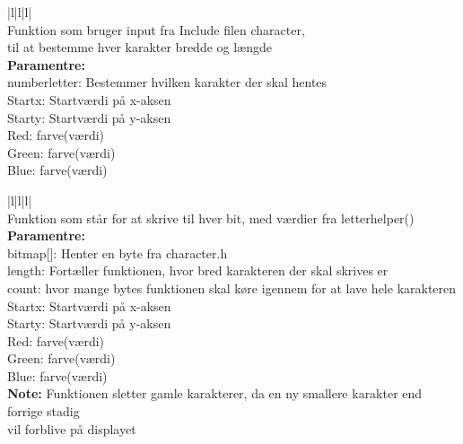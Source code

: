 \begin{center}
\begin{tabular}{ |l|l|l| }
\hline
{} \\
\hline
Funktion som bruger input fra Include filen character,\\ til at bestemme hver karakter bredde og længde\\
\hline
\textbf{Paramentre:}  \\numberletter: Bestemmer hvilken karakter der skal hentes\\ Startx: Startværdi på x-aksen \\Starty: Startværdi på y-aksen\\ Red: farve(værdi)\\ Green: farve(værdi) \\ Blue: farve(værdi)\\
\hline
\end{tabular}
\end{center}

\begin{center}
\begin{tabular}{ |l|l|l| }
\hline
{} \\
\hline
Funktion som står for at skrive til hver bit, med værdier fra letterhelper()\\
\hline
\textbf{Paramentre:}  \\bitmap[]: Henter en byte fra character.h\\ length: Fortæller funktionen, hvor bred karakteren der skal skrives er\\ count: hvor mange bytes funktionen skal køre igennem for at lave hele karakteren\\ Startx: Startværdi på x-aksen \\Starty: Startværdi på y-aksen\\ Red: farve(værdi)\\ Green: farve(værdi) \\ Blue: farve(værdi)\\
\textbf{Note:} Funktionen sletter gamle karakterer, da en ny smallere karakter end forrige stadig\\ vil forblive på displayet\\

\hline
\end{tabular}
\end{center}  

